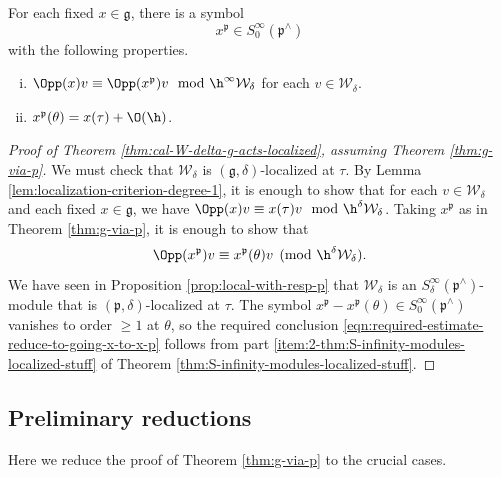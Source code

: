 \begin{theorem}\label{thm:g-via-p}
  For each fixed $x \in \mathfrak{g}$, there is a symbol
  \[x^{\mathfrak{p}} \in S_0^\infty(\mathfrak{p}^\wedge)\] with the following properties.
  \begin{enumerate}[(i)]
  \item $\Opp(x) v \equiv \Opp(x^\mathfrak{p}) v \mod{\h^\infty \mathcal{W}_\delta}$ for each $v \in \mathcal{W}_\delta$.
  \item $x^\mathfrak{p}(\theta) = x(\tau) + \O(\h)$.
  \end{enumerate}
\end{theorem}

\begin{proof}[Proof of Theorem
  \ref{thm:cal-W-delta-g-acts-localized},
  assuming Theorem \ref{thm:g-via-p}]
  We must check that $\mathcal{W}_\delta$ is $(\mathfrak{g},\delta)$-localized at $\tau$.  By Lemma \ref{lem:localization-criterion-degree-1}, it is enough to show that for each $v \in \mathcal{W}_\delta$ and each fixed $x \in \mathfrak{g}$, we have $\Opp(x) v \equiv x(\tau) v \mod{\h^\delta \mathcal{W}_\delta}$.  Taking $x^\mathfrak{p}$ as in Theorem \ref{thm:g-via-p}, it is enough to show that
  \begin{equation}\label{eqn:required-estimate-reduce-to-going-x-to-x-p}
    \Opp(x^\mathfrak{p}) v
    \equiv x^\mathfrak{p}(\theta) v
    \pmod{\h^\delta \mathcal{W}_\delta}.
  \end{equation}
  We have seen in Proposition \ref{prop:local-with-resp-p} that $\mathcal{W}_\delta$ is an $S^\infty_\delta(\mathfrak{p}^\wedge)$-module that is $(\mathfrak{p},\delta)$-localized at $\tau$.  The symbol $x^\mathfrak{p} - x^\mathfrak{p}(\theta) \in S^\infty_0(\mathfrak{p}^\wedge)$ vanishes to order $\geq 1$ at $\theta$, so the required conclusion \eqref{eqn:required-estimate-reduce-to-going-x-to-x-p} follows from part \eqref{item:2-thm:S-infinity-modules-localized-stuff} of Theorem \ref{thm:S-infinity-modules-localized-stuff}.
\end{proof}


\subsection{Preliminary reductions}\label{sec:cuhn9jrbjg}
Here we reduce the proof of Theorem \ref{thm:g-via-p} to the crucial cases.

